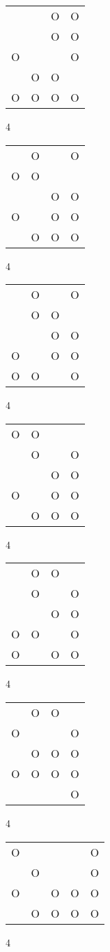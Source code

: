 \begin{tabular}{|m{0.2cm}m{0.2cm}m{0.2cm}m{0.2cm}|}\hline
 & &O&O\\
 & &O&O\\
O& & &O\\
 &O&O& \\
O&O&O&O\\
\hline\end{tabular}4
\begin{tabular}{|m{0.2cm}m{0.2cm}m{0.2cm}m{0.2cm}|}\hline
 &O& &O\\
O&O& & \\
 & &O&O\\
O& &O&O\\
 &O&O&O\\
\hline\end{tabular}4
\begin{tabular}{|m{0.2cm}m{0.2cm}m{0.2cm}m{0.2cm}|}\hline
 &O& &O\\
 &O&O& \\
 & &O&O\\
O& &O&O\\
O&O& &O\\
\hline\end{tabular}4
\begin{tabular}{|m{0.2cm}m{0.2cm}m{0.2cm}m{0.2cm}|}\hline
O&O& & \\
 &O& &O\\
 & &O&O\\
O& &O&O\\
 &O&O&O\\
\hline\end{tabular}4
\begin{tabular}{|m{0.2cm}m{0.2cm}m{0.2cm}m{0.2cm}|}\hline
 &O&O& \\
 &O& &O\\
 & &O&O\\
O&O& &O\\
O& &O&O\\
\hline\end{tabular}4
\begin{tabular}{|m{0.2cm}m{0.2cm}m{0.2cm}m{0.2cm}|}\hline
 &O&O& \\
O& & &O\\
 &O&O&O\\
O&O&O&O\\
 & & &O\\
\hline\end{tabular}4
\begin{tabular}{|m{0.2cm}m{0.2cm}m{0.2cm}m{0.2cm}m{0.2cm}|}\hline
O& & & &O\\
 &O& & &O\\
O& &O&O&O\\
 &O&O&O&O\\
\hline\end{tabular}4
